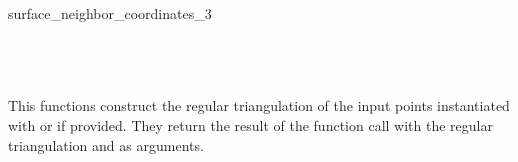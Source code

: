 \begin{ccRefFunction}{surface_neighbor_coordinates_3}
\ccSeeAlso
{} \\
\\ 
\\  
\\

\ccImplementation This functions construct the regular triangulation of the input points 
instantiated with  or  if provided. 
They return the result of the function call 
with the regular triangulation and  as arguments.

\end{ccRefFunction}
